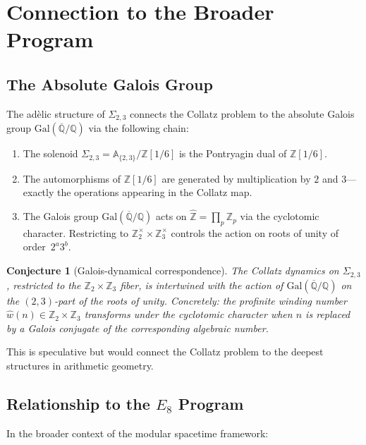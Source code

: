 \documentclass[11pt,a4paper]{article}
\newcommand{\Z}{\mathbb{Z}}
\newcommand{\Q}{\mathbb{Q}}
\newcommand{\A}{\mathbb{A}}
\newcommand{\Zhat}{\widehat{\Z}}
\newcommand{\Gal}{\mathrm{Gal}}
\theoremstyle{plain}
\newtheorem{conjecture}[theorem]{Conjecture}
\theoremstyle{definition}
\begin{document}
\section{Connection to the Broader Program}\label{sec:broader}

\subsection{The Absolute Galois Group}

The ad\`elic structure of $\Sigma_{2,3}$ connects the Collatz problem to the absolute Galois group $\Gal(\overline{\Q}/\Q)$ via the following chain:

\begin{enumerate}
    \item The solenoid $\Sigma_{2,3} = \A_{\{2,3\}}/\Z[1/6]$ is the Pontryagin dual of $\Z[1/6]$.
    \item The automorphisms of $\Z[1/6]$ are generated by multiplication by $2$ and $3$---exactly the operations appearing in the Collatz map.
    \item The Galois group $\Gal(\overline{\Q}/\Q)$ acts on $\Zhat = \prod_p \Z_p$ via the cyclotomic character. Restricting to $\Z_2^\times \times \Z_3^\times$ controls the action on roots of unity of order~$2^a 3^b$.
\end{enumerate}

\begin{conjecture}[Galois-dynamical correspondence]
    The Collatz dynamics on $\Sigma_{2,3}$, restricted to the $\Z_2 \times \Z_3$ fiber, is intertwined with the action of $\Gal(\overline{\Q}/\Q)$ on the $(2,3)$-part of the roots of unity. Concretely: the profinite winding number $\hat{w}(n) \in \Z_2 \times \Z_3$ transforms under the cyclotomic character when $n$ is replaced by a Galois conjugate of the corresponding algebraic number.
\end{conjecture}

This is speculative but would connect the Collatz problem to the deepest structures in arithmetic geometry.

\subsection{Relationship to the $E_8$ Program}

In the broader context of the modular spacetime framework:
\end{document}
